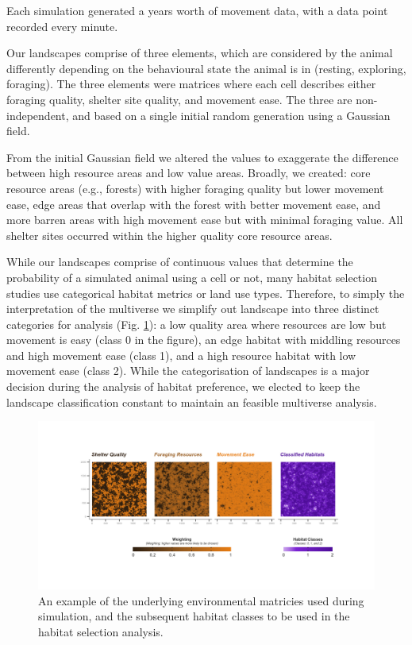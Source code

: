\documentclass[10pt,a4paper]{article}
\begin{document}
Each simulation generated a years worth of movement data, with a data point recorded every minute.

Our landscapes comprise of three elements, which are considered by the animal differently depending on the behavioural state the animal is in (resting, exploring, foraging).
The three elements were matrices where each cell describes either foraging quality, shelter site quality, and movement ease.
The three are non-independent, and based on a single initial random generation using a Gaussian field.

From the initial Gaussian field we altered the values to exaggerate the difference between high resource areas and low value areas.
Broadly, we created: core resource areas (e.g., forests) with higher foraging quality but lower movement ease, edge areas that overlap with the forest with better movement ease, and more barren areas with high movement ease but with minimal foraging value.
All shelter sites occurred within the higher quality core resource areas.

While our landscapes comprise of continuous values that determine the probability of a simulated animal using a cell or not, many habitat selection studies use categorical habitat metrics or land use types.
Therefore, to simply the interpretation of the multiverse we simplify out landscape into three distinct categories for analysis (Fig. \ref{fig:landscapeExample}): a low quality area where resources are low but movement is easy (class 0 in the figure), an edge habitat with middling resources and high movement ease (class 1), and a high resource habitat with low movement ease (class 2).
While the categorisation of landscapes is a major decision during the analysis of habitat preference, we elected to keep the landscape classification constant to maintain an feasible multiverse analysis.

\begin{figure}
\includegraphics[width=1\linewidth]{../figures/landscapeExample} \caption{An example of the underlying environmental matricies used during simulation, and the subsequent habitat classes to be used in the habitat selection analysis.}\label{fig:landscapeExample}
\end{figure}
\end{document}
